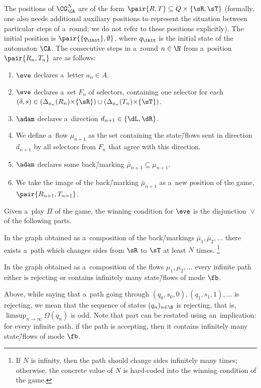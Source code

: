 The positions of $\CG^N_\CA$ are of the form $\pair{R,T}\subseteq Q\times\{\sR,\sT\}$
(formally, one also needs additional auxiliary positions to represent the situation between particular steps of a~round; we do not refer to these positions explicitly).
The initial position is $\pair{\{q_\init\}, \emptyset}$, where $q_\init$ is the initial state of the automaton $\CA$.
The consecutive steps in a~round $n\in\N$ from a~position $\pair{R_n,T_n}$ are as follows:
\begin{enumerate}
\item \label{st:G-letter}	$\eve$ declares a~letter $a_n\in A$.
\item \label{st:G-selectors}	$\eve$ declares a~set $F_n$ of selectors, containing one selector for each $(\delta,s)\in(\Delta_{a_n}(R_n){\times}\{\sR\})\cup(\Delta_{a_n}(T_n){\times}\{\sT\})$.
\item \label{st:G-direction}	$\adam$ declares a~direction $d_{n+1}\in\{\dL,\dR\}$.
\item \label{st:G-flow}	We define a~flow $\mu_{n+1}$ as the set containing the state\=/flows sent in direction $d_{n+1}$ by all selectors from $F_n$ that agree with this direction.\label{it:step-flow}
\item \label{st:G-backmarking}	$\adam$ declares some back\=/marking $\bar\mu_{n+1}\subseteq\mu_{n+1}$.
\item \label{st:G-image}	We take the image of the back\=/marking $\bar\mu_{n+1}$ as a~new position of the game, $\pair{R_{n+1},T_{n+1}}$.
\end{enumerate}
\noindent %
Given a~play $\Pi$ of the game, the winning condition for $\eve$ is the disjunction ${}\lor{}$ of the following parts.
\begin{description}[leftmargin=4em]
\item[A($N$)] In the graph obtained as a~composition of the back\=/markings $\bar\mu_1,\bar\mu_2,\dots$ there exists a~path which changes sides from $\sR$ to $\sT$ at least $N$ times.%
	\footnote{If $N$ is infinity, then the path should change sides infinitely many times; otherwise, the concrete value of $N$ is hard-coded into the winning condition of the game.}
\item[B] In the graph obtained as a~composition of the flows $\mu_1,\mu_2,\dots$ every infinite path either is rejecting or contains infinitely many state\=/flows of mode $\fb$.
\end{description}
\noindent %
Above, while saying that a~path going through $(q_0,s_0,0),(q_1,s_1,1),\dots$ is rejecting, we mean that the sequence of states $(q_n)_{n\in\N}$ is rejecting, that is, $\limsup_{n\to\infty}\Omega(q_n)$ is odd.
Note that part  can be restated using an~implication: for every infinite path, if the path is accepting, then it contains infinitely many state\=/flows of mode $\fb$.

